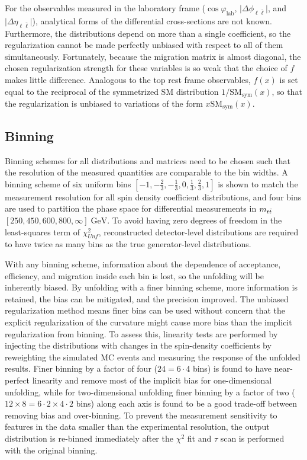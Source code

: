 For the observables measured in the laboratory frame ($\cos\varphi_{\mathrm{lab}}$, $\vert \Delta\phi_{\ell\bar{\ell}} \vert$, and $\vert \Delta\eta_{\ell\bar{\ell}} \vert$), analytical forms of the differential cross-sections are not known. 
Furthermore, the distributions depend on more than a single coefficient, so the regularization cannot be made perfectly unbiased with respect to all of them simultaneously. 
Fortunately, because the migration matrix is almost diagonal, the chosen regularization strength for these variables is so weak that the choice of $f$ makes little difference. 
Analogous to the top rest frame observables, $f(x)$ is set equal to the reciprocal of the symmetrized SM distribution $1/\mathrm{SM_{sym}}(x)$, so that the regularization is unbiased to variations of the form $x \mathrm{SM_{sym}}(x)$. 

\subsection{Binning}
\label{Binning}
Binning schemes for all distributions and matrices need to be chosen such that the resolution of the measured quantities are comparable to the bin widths.
A binning scheme of six uniform bins $[-1,-\frac{2}{3},-\frac{1}{3},0,\frac{1}{3},\frac{2}{3},1]$ is shown to match the measurement resolution for all spin density coefficient distributions, and four bins are used to partition the phase space for differential measurements in $m_{t\bar{t}}$ $[250,450,600,800,\infty] \; \si{\GeV}$.
To avoid having zero degrees of freedom in the least-squares term of $\chi^{2}_{Unf}$, reconstructed detector-level distributions are required to have twice as many bins as the true generator-level distributions.

With any binning scheme, information about the dependence of acceptance, efficiency, and migration inside each bin is lost, so the unfolding will be inherently biased.
By unfolding with a finer binning scheme, more information is retained, the bias can be mitigated, and the precision improved.
The unbiased regularization method means finer bins can be used without concern that the explicit regularization of the curvature might cause more bias than the implicit regularization from binning.
To assess this, linearity tests are performed by injecting the distributions with changes in the spin-density coefficients by reweighting the simulated MC events and measuring the response of the unfolded results.
Finer binning by a factor of four ($24 = 6 \cdot 4$ bins) is found to have near-perfect linearity and remove most of the implicit bias for one-dimensional unfolding, while for two-dimensional unfolding finer binning by a factor of two ($12 \times 8 = 6 \cdot 2 \times 4 \cdot 2$ bins) along each axis is found to be a good trade-off between removing bias and over-binning.
To prevent the measurement sensitivity to features in the data smaller than the experimental resolution, the output distribution is re-binned immediately after the $\chi^2$ fit and $\tau$ scan is performed with the original binning.











